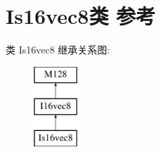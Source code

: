 \hypertarget{class_is16vec8}{}\section{Is16vec8类 参考}
\label{class_is16vec8}
类 Is16vec8 继承关系图\+:\begin{figure}[H]
\begin{center}
\leavevmode
\includegraphics[height=3.000000cm]{class_is16vec8}
\end{center}
\end{figure}
